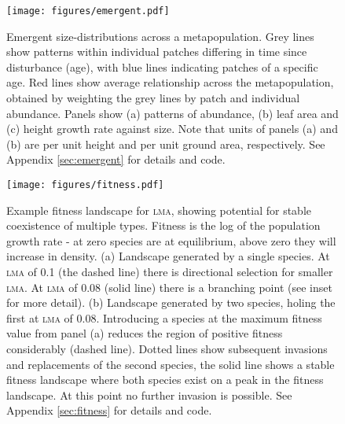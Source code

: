 \documentclass[a4paper,11pt]{article}
\begin{document}
\newpage

\begin{figure}[h!]
\centering
\texttt{[image: figures/emergent.pdf]}
\caption{Emergent size-distributions across a metapopulation.
Grey lines show patterns within individual patches differing in time
since disturbance (age), with blue lines indicating patches of a
specific age. Red lines show average relationship across the metapopulation, 
obtained by weighting the grey lines by patch and individual abundance. 
Panels show (a) patterns of abundance, (b) leaf area and
(c) height growth rate against size. Note that units of panels (a) and
(b) are per unit height and per unit ground area, respectively.  See Appendix \ref{sec:emergent} for details and code.}
\label{fig:emergent}
\end{figure}

\newpage

\begin{figure}[h!]
\centering
\texttt{[image: figures/fitness.pdf]}
\caption{Example fitness landscape for \textsc{lma}, showing potential for stable
coexistence of multiple types.  Fitness is the log of the population growth
rate - at zero species are at equilibrium, above zero they will increase in
density.  (a) Landscape generated by a single species.  At \textsc{lma} of 0.1 (the
dashed line) there is directional selection for smaller \textsc{lma}.  At \textsc{lma} of 0.08
(solid line) there is a branching point (see inset for more detail).  (b)
Landscape generated by two species, holing the first at \textsc{lma} of 0.08.
Introducing a species at the maximum fitness value from panel (a) reduces the
region of positive fitness considerably (dashed line).  Dotted lines show
subsequent invasions and replacements of the second species, the solid
line shows a stable fitness landscape where both species exist on a peak in
the fitness landscape.  At this point no further invasion is
possible.  See Appendix \ref{sec:fitness} for details and code.}
\label{fig:fitness}
\end{figure}

\clearpage
\setcounter{secnumdepth}{1}
\end{document}
